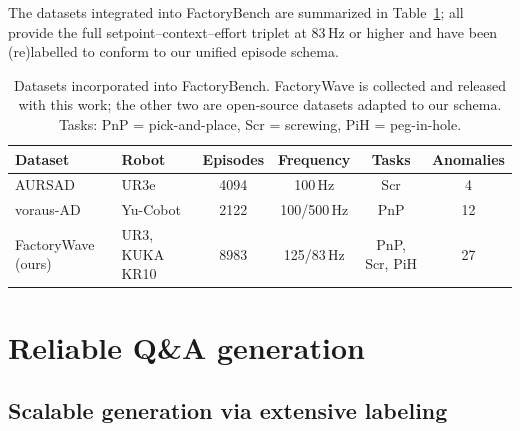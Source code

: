 The datasets integrated into FactoryBench are summarized in Table~\ref{tab:datasets}; all provide the full setpoint--context--effort triplet at 83\,Hz or higher and have been (re)labelled to conform to our unified episode schema.

\begin{table}[htbp]
    \centering
    \caption{Datasets incorporated into FactoryBench. FactoryWave is collected and released with this work; the other two are open-source datasets adapted to our schema. Tasks: PnP = pick-and-place, Scr = screwing, PiH = peg-in-hole.}
    \label{tab:datasets}
    \small
    \setlength{\tabcolsep}{4pt}
    \begin{tabular}{@{}l l c c c c@{}}
        \toprule
        Dataset                                & Robot          & Episodes & Frequency   & Tasks         & Anomalies \\
        \midrule
        AURSAD~\cite{leporowski2022aursad}     & UR3e           & 4094     & 100\,Hz     & Scr           & 4         \\
        voraus-AD~\cite{brockmann2023vorausad} & Yu-Cobot       & 2122     & 100/500\,Hz & PnP           & 12        \\
        FactoryWave (ours)                     & UR3, KUKA KR10 & 8983     & 125/83\,Hz  & PnP, Scr, PiH & 27        \\
        \bottomrule
    \end{tabular}
\end{table}


\section{Reliable Q\&A generation}

\subsection{Scalable generation via extensive labeling}

